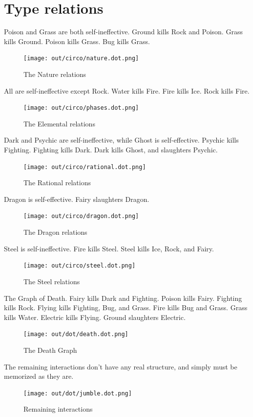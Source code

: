 \section{Type relations}
Poison and Grass are both self-ineffective.
Ground kills Rock and Poison.
Grass kills Ground.
Poison kills Grass.
Bug kills Grass.
\begin{figure}
\centering
\texttt{[image: out/circo/nature.dot.png]}
\caption{The Nature relations}
\end{figure}

All are self-ineffective except Rock.
Water kills Fire.
Fire kills Ice.
Rock kills Fire.
\begin{figure}
\centering
\texttt{[image: out/circo/phases.dot.png]}
\caption{The Elemental relations}
\end{figure}

Dark and Psychic are self-ineffective, while Ghost is self-effective.
Psychic kills Fighting.
Fighting kills Dark.
Dark kills Ghost, and slaughters Psychic.
\begin{figure}
\centering
\texttt{[image: out/circo/rational.dot.png]}
\caption{The Rational relations}
\end{figure}

Dragon is self-effective.
Fairy slaughters Dragon.
\begin{figure}
\centering
\texttt{[image: out/circo/dragon.dot.png]}
\caption{The Dragon relations}
\end{figure}

Steel is self-ineffective.
Fire kills Steel.
Steel kills Ice, Rock, and Fairy.
\begin{figure}
\centering
\texttt{[image: out/circo/steel.dot.png]}
\caption{The Steel relations}
\end{figure}

The Graph of Death.
Fairy kills Dark and Fighting.
Poison kills Fairy.
Fighting kills Rock.
Flying kills Fighting, Bug, and Grass.
Fire kills Bug and Grass.
Grass kills Water.
Electric kills Flying.
Ground slaughters Electric.
\begin{figure}
\centering
\texttt{[image: out/dot/death.dot.png]}
\caption{The Death Graph}
\end{figure}

The remaining interactions don't have any real structure, and simply must be
memorized as they are.
\begin{figure}
\centering
\texttt{[image: out/dot/jumble.dot.png]}
\caption{Remaining interactions}
\end{figure}
